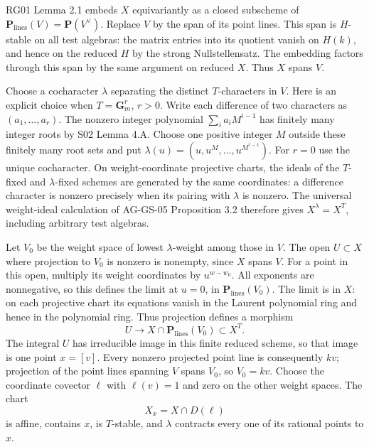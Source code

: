 \documentclass[11pt,a4paper,openany]{report}
\newcounter{none}
\begin{document}
RG01 Lemma 2.1 embeds \(X\) equivariantly as a closed subscheme of \(\mathbf P_{\mathrm{lines}}(V)=\mathbf P(V^\vee)\). Replace \(V\) by the span of its point lines. This span is \(H\)-stable on all test algebras: the matrix entries into its quotient vanish on \(H(k)\), and hence on the reduced \(H\) by the strong Nullstellensatz. The embedding factors through this span by the same argument on reduced \(X\). Thus \(X\) spans \(V\).

Choose a cocharacter \(\lambda\) separating the distinct \(T\)-characters in \(V\). Here is an explicit choice when \(T=\mathbf G_m^r\), \(r>0\). Write each difference of two characters as \((a_1,\ldots,a_r)\). The nonzero integer polynomial \(\sum_i a_i M^{i-1}\) has finitely many integer roots by S02 Lemma 4.A. Choose one positive integer \(M\) outside these finitely many root sets and put \(\lambda(u)=(u,u^M,\ldots,u^{M^{r-1}})\). For \(r=0\) use the unique cocharacter. On weight-coordinate projective charts, the ideals of the \(T\)-fixed and \(\lambda\)-fixed schemes are generated by the same coordinates: a difference character is nonzero precisely when its pairing with \(\lambda\) is nonzero. The universal weight-ideal calculation of AG-GS-05 Proposition 3.2 therefore gives \(X^\lambda=X^T\), including arbitrary test algebras.

Let \(V_0\) be the weight space of lowest \(\lambda\)-weight among those in \(V\). The open \(U\subset X\) where projection to \(V_0\) is nonzero is nonempty, since \(X\) spans \(V\). For a point in this open, multiply its weight coordinates by \(u^{w-w_0}\). All exponents are nonnegative, so this defines the limit at \(u=0\), in \(\mathbf P_{\mathrm{lines}}(V_0)\). The limit is in \(X\): on each projective chart its equations vanish in the Laurent polynomial ring and hence in the polynomial ring. Thus projection defines a morphism \[
 U\longrightarrow X\cap\mathbf P_{\mathrm{lines}}(V_0)\subset X^T.
\] The integral \(U\) has irreducible image in this finite reduced scheme, so that image is one point \(x=[v]\). Every nonzero projected point line is consequently \(kv\); projection of the point lines spanning \(V\) spans \(V_0\), so \(V_0=kv\). Choose the coordinate covector \(\ell\) with \(\ell(v)=1\) and zero on the other weight spaces. The chart \[
 X_x=X\cap D(\ell)
\] is affine, contains \(x\), is \(T\)-stable, and \(\lambda\) contracts every one of its rational points to \(x\).
\end{document}
